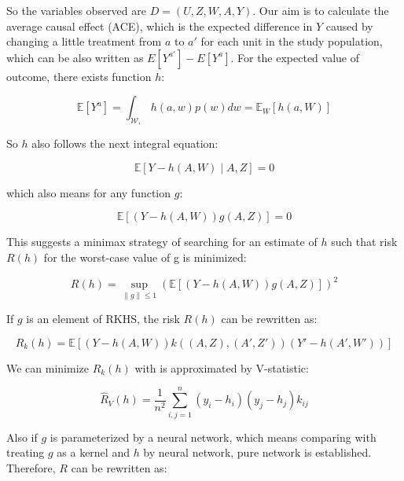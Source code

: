 \documentclass[11pt]{article}
\begin{document}
So the variables observed are $D=(U,Z,W,A,Y)$.  Our aim is to calculate the average causal effect (ACE), which is the expected difference in $Y$ caused by changing a little treatment from $a$ to $a'$
for each unit in the study population, which can be also written as $E[Y^{a'}]-E[Y^a]$. For the expected value of outcome, there exists function $h$:

\begin{equation}
    \label{E_Y}
    \mathbb{E}\left[Y^{a}\right]=\int_{\mathcal{W},} h(a, w) p(w) d w =\mathbb{E}_{W}[h(a, W)]
\end{equation}

So $h$ also follows the next integral equation:

\begin{equation}
    \label{h1}
    \mathbb{E}[Y-h(A, W) \mid A, Z]=0
\end{equation}

which also means for any function $g$:

\begin{equation}
    \label{g1}
    \mathbb{E}[(Y-h(A, W))g(A,Z)]=0
\end{equation}

This suggests a minimax strategy of searching for an estimate of $h$ such that risk $R(h)$ for the worst-case value of g is minimized:

\begin{equation}
\label{Rh}
    R(h)=\sup _{\|g\| \leq 1}(\mathbb{E}[(Y-h(A, W)) g(A, Z)])^{2}
\end{equation}

If $g$ is an element of RKHS, the risk $R(h)$ can be rewritten as:

\begin{equation}
    \label{rewrite}
    R_k(h)=\mathbb{E}[(Y-h(A, W)) k((A, Z),(A',Z'))(Y'-h(A',W'))]
\end{equation}

We can minimize $R_k(h)$ with is approximated by V-statistic:

\begin{equation}
    \label{vstat}
    \hat{R}_{V}(h)=\frac{1}{n^{2}} \sum_{i, j=1}^{n}\left(y_{i}-h_{i}\right)\left(y_{j}-h_{j}\right) k_{i j}
\end{equation}

Also if $g$ is parameterized by a neural network, which means comparing with treating $g$ as a kernel and $h$ by neural network, pure network is established. Therefore, $R$ can be rewritten as:
\end{document}
